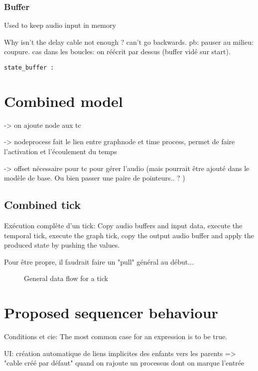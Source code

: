 \documentclass[applsci,article,submit,moreauthors,pdftex,10pt,a4paper]{mdpi}
\begin{document}
\subsubsection{Buffer}
Used to keep audio input in memory

Why isn't the delay cable not enough ? can't go backwards. 
pb: pauser au milieu: coupure. cas dans les boucles: on réécrit par dessus (buffer vidé sur start).
\begin{lstlisting}
state_buffer :
\end{lstlisting}

\section{Combined model}
-> on ajoute node aux tc

-> nodeprocess fait le lien entre graphnode et time process, permet de faire l'activation et l'écoulement du temps

-> offset nécessaire pour tc pour gérer l'audio (mais pourrait être ajouté dans le modèle de base. Ou bien passer une paire de pointeurs.. ? )

\subsection{Combined tick}
Exécution complète d'un tick: 
Copy audio buffers and input data, execute the temporal tick, execute the graph tick, copy the output audio buffer and apply the produced state by pushing the values.

Pour être propre, il faudrait faire un "pull" général au début...
\begin{figure}
	\caption{General data flow for a tick}
\end{figure}

\section{Proposed sequencer behaviour}
Conditions et cie: The most common case for an expression is to be true.

UI: création automatique de liens implicites des enfants vers les parents
=> "cable créé par défaut" quand on rajoute un processus dont on marque l'entrée
\end{document}
